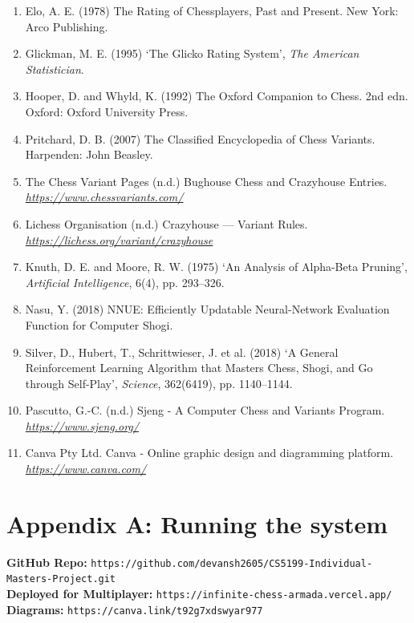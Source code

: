 \documentclass[11pt,a4paper]{article}
\begin{document}
\begin{enumerate}[leftmargin=*]
\item Elo, A. E. (1978) The Rating of Chessplayers, Past and Present. New York: Arco Publishing.

\item Glickman, M. E. (1995) ‘The Glicko Rating System’, \textit{The American Statistician}.

\item Hooper, D. and Whyld, K. (1992) The Oxford Companion to Chess. 2nd edn. Oxford: Oxford University Press.

\item Pritchard, D. B. (2007) The Classified Encyclopedia of Chess Variants. Harpenden: John Beasley.

\item The Chess Variant Pages (n.d.) Bughouse Chess and Crazyhouse Entries. \textit{\url{https://www.chessvariants.com/}} 

\item Lichess Organisation (n.d.) Crazyhouse --- Variant Rules. \textit{\url{https://lichess.org/variant/crazyhouse}} 

\item Knuth, D. E. and Moore, R. W. (1975) ‘An Analysis of Alpha-Beta Pruning’, \textit{Artificial Intelligence}, 6(4), pp. 293--326.

\item Nasu, Y. (2018) NNUE: Efficiently Updatable Neural-Network Evaluation Function for Computer Shogi.

\item Silver, D., Hubert, T., Schrittwieser, J. et al. (2018) ‘A General Reinforcement Learning Algorithm that Masters Chess, Shogi, and Go through Self-Play’, \textit{Science}, 362(6419), pp. 1140--1144.

\item Pascutto, G.-C. (n.d.) Sjeng - A Computer Chess and Variants Program. \textit{\url{https://www.sjeng.org/}} 
\item Canva Pty Ltd. Canva - Online graphic design and diagramming platform.  \textit{\url{https://www.canva.com/}}  



\end{enumerate}
\newpage
\section*{Appendix A: Running the system}

\noindent\textbf{GitHub Repo:} \texttt{https://github.com/devansh2605/CS5199-Individual-Masters-Project.git} \\
\textbf{Deployed for Multiplayer:} \texttt{https://infinite-chess-armada.vercel.app/} \\
\textbf{Diagrams:} \texttt{https://canva.link/t92g7xdswyar977}
\end{document}
